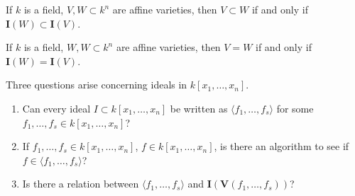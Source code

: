                 \begin{theorem}
                    If $k$ is a field, $V,W\subset k^n$ are affine
                    varieties, then $V\subset W$ if and only if
                    $\mathbf{I}(W)\subset \mathbf{I}(V)$.
                \end{theorem}
                \begin{theorem}
                    If $k$ is a field, $W,W\subset k^n$ are
                    affine varieties, then $V=W$ if
                    and only if $\mathbf{I}(W)=\mathbf{I}(V)$.
                \end{theorem}
                Three questions arise concerning
                ideals in $k[x_1,\hdots ,x_n]$.
                \begin{enumerate}
                    \item Can every ideal $I\subset k[x_1,\hdots ,x_n]$
                          be written as $\langle f_1,\hdots, f_s\rangle$
                          for some $f_1,\hdots, f_s \in k[x_1,\hdots ,x_n]$?
                    \item If $f_1,\hdots, f_s\in k[x_1,\hdots ,x_n]$,
                          $f\in k[x_1,\hdots ,x_n]$, is there an
                          algorithm to see if $f\in\langle f_{1},\hdots,f_{s}\rangle$?
                    \item Is there a relation between
                          $\langle f_1,\hdots, f_s\rangle$ and
                          $\mathbf{I}(\mathbf{V}(f_1,\hdots, f_s))$?
                \end{enumerate}
